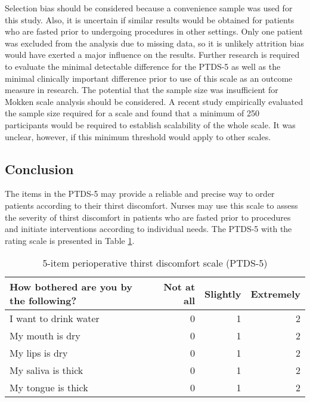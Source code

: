 \documentclass[12pt,twoside,]{pinp}
\begin{document}
Selection bias should be considered because a convenience sample was
used for this study. Also, it is uncertain if similar results would be
obtained for patients who are fasted prior to undergoing procedures in
other settings. Only one patient was excluded from the analysis due to
missing data, so it is unlikely attrition bias would have exerted a
major influence on the results. Further research is required to evaluate
the minimal detectable difference for the PTDS-5 as well as the minimal
clinically important difference prior to use of this scale as an outcome
measure in research. The potential that the sample size was insufficient
for Mokken scale analysis should be considered. A recent study
empirically evaluated the sample size required for a scale and found
that a minimum of 250 participants would be required to establish
scalability of the whole scale.\citep{watson2018} It was unclear,
however, if this minimum threshold would apply to other scales.

\hypertarget{conclusion}{%
\subsection{Conclusion}\label{conclusion}}

The items in the PTDS-5 may provide a reliable and precise way to order
patients according to their thirst discomfort. Nurses may use this scale
to assess the severity of thirst discomfort in patients who are fasted
prior to procedures and initiate interventions according to individual
needs. The PTDS-5 with the rating scale is presented in Table
\ref{tab:tabptds}.

\begin{table}

\caption{\label{tab:tabptds}5-item perioperative thirst discomfort scale (PTDS-5)}
\centering
\begin{tabular}[t]{lrrr}
\toprule
How bothered are you by the following? & Not at all & Slightly & Extremely\\
\midrule
I want to drink water & 0 & 1 & 2\\
My mouth is dry & 0 & 1 & 2\\
My lips is dry & 0 & 1 & 2\\
My saliva is thick & 0 & 1 & 2\\
My tongue is thick & 0 & 1 & 2\\
\bottomrule
\end{tabular}
\end{table}


\pnasbreak



\end{document}
